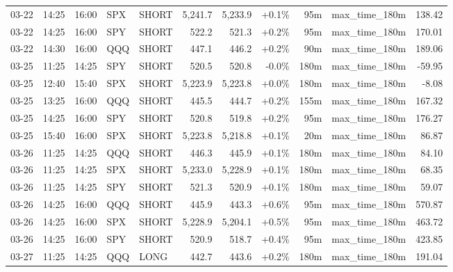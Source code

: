 \documentclass[11pt,a4paper,twoside]{article}
\begin{document}
\begin{center}
\begin{longtable}{>{\color{txtmain}}l l l l l r r r r >{\color{txtmain}}l r}
03-22 & 14:25 & 16:00 & SPX & SHORT & 5,241.7 & 5,233.9 & \textcolor{wingreen}{+0.1\%} & 95m & max\_time\_180m & \textcolor{wingreen}{138.42} \\
03-22 & 14:25 & 16:00 & SPY & SHORT & 522.2 & 521.3 & \textcolor{wingreen}{+0.2\%} & 95m & max\_time\_180m & \textcolor{wingreen}{170.01} \\
03-22 & 14:30 & 16:00 & QQQ & SHORT & 447.1 & 446.2 & \textcolor{wingreen}{+0.2\%} & 90m & max\_time\_180m & \textcolor{wingreen}{189.06} \\
03-25 & 11:25 & 14:25 & SPY & SHORT & 520.5 & 520.8 & \textcolor{lossred}{-0.0\%} & 180m & max\_time\_180m & \textcolor{lossred}{-59.95} \\
03-25 & 12:40 & 15:40 & SPX & SHORT & 5,223.9 & 5,223.8 & \textcolor{wingreen}{+0.0\%} & 180m & max\_time\_180m & \textcolor{lossred}{-8.08} \\
03-25 & 13:25 & 16:00 & QQQ & SHORT & 445.5 & 444.7 & \textcolor{wingreen}{+0.2\%} & 155m & max\_time\_180m & \textcolor{wingreen}{167.32} \\
03-25 & 14:25 & 16:00 & SPY & SHORT & 520.8 & 519.8 & \textcolor{wingreen}{+0.2\%} & 95m & max\_time\_180m & \textcolor{wingreen}{176.27} \\
03-25 & 15:40 & 16:00 & SPX & SHORT & 5,223.8 & 5,218.8 & \textcolor{wingreen}{+0.1\%} & 20m & max\_time\_180m & \textcolor{wingreen}{86.87} \\
03-26 & 11:25 & 14:25 & QQQ & SHORT & 446.3 & 445.9 & \textcolor{wingreen}{+0.1\%} & 180m & max\_time\_180m & \textcolor{wingreen}{84.10} \\
03-26 & 11:25 & 14:25 & SPX & SHORT & 5,233.0 & 5,228.9 & \textcolor{wingreen}{+0.1\%} & 180m & max\_time\_180m & \textcolor{wingreen}{68.35} \\
03-26 & 11:25 & 14:25 & SPY & SHORT & 521.3 & 520.9 & \textcolor{wingreen}{+0.1\%} & 180m & max\_time\_180m & \textcolor{wingreen}{59.07} \\
03-26 & 14:25 & 16:00 & QQQ & SHORT & 445.9 & 443.3 & \textcolor{wingreen}{+0.6\%} & 95m & max\_time\_180m & \textcolor{wingreen}{570.87} \\
03-26 & 14:25 & 16:00 & SPX & SHORT & 5,228.9 & 5,204.1 & \textcolor{wingreen}{+0.5\%} & 95m & max\_time\_180m & \textcolor{wingreen}{463.72} \\
03-26 & 14:25 & 16:00 & SPY & SHORT & 520.9 & 518.7 & \textcolor{wingreen}{+0.4\%} & 95m & max\_time\_180m & \textcolor{wingreen}{423.85} \\
03-27 & 11:25 & 14:25 & QQQ & LONG & 442.7 & 443.6 & \textcolor{wingreen}{+0.2\%} & 180m & max\_time\_180m & \textcolor{wingreen}{191.04} \\

\end{longtable}
\end{center}
\end{document}
